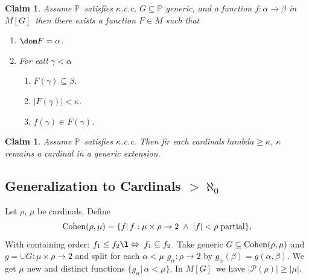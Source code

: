 \documentclass[11pt,pdftex,twoside,a4paper]{article}
\newcommand{\Cohen}{\mathop{\rm Cohen}\nolimits}
\newcommand{\dsP}{\ensuremath{\mathds{P}}}
\newcommand{\kcc}{\(\kappa\).c.c}
\newcommand{\MG}{\ensuremath{M[G]}}
\newcommand{\Power}{\ensuremath{\mathcal{P}}}
\newtheorem{claim}[thm]{Claim}
\theoremstyle{definition}
\begin{document}
\begin{claim}
Assume \dsP\ satisfies \kcc, \(G\subseteq\dsP\) generic, and a function
\(f:\alpha\to\beta\) in \MG\ then there exists a function \(F\in M\)
such that
\begin{enumerate}[label={(\alph*)}]
  \item \(\dom F = \alpha\).
  \item For eall \(\gamma<\alpha\)
    \begin{enumerate}[label={(\alph{enumi}\arabic*)}]
      \item \(F(\gamma)\subseteq \beta\).
      \item \(|F(\gamma)|<\kappa\).
      \item \(f(\gamma)\in F(\gamma)\).
    \end{enumerate}
\end{enumerate}
\end{claim}

\begin{claim}
Assume \dsP\ satisfies \kcc. Then fir each cardinals \(lambda\geq\kappa\), 
\(\kappa\) remains a cardinal in a generic extension.
\end{claim}

\subsection{Generalization to Cardinals \(>\aleph_0\)}

Let \(\rho\), \(\mu\) be cardinals. Define
\begin{equation*}
\Cohen(\rho, \mu) = \{f|\, f:\mu\times\rho\to 2\;\land\;|f|<\rho\;
  \textnormal{partial}\},
\end{equation*}
With containing order: \(f_1\leq f_2\l\Leftrightarrow\;f_1\subseteq f_2\).
Take generic \(G\subseteq\Cohen(\rho, \mu)\) and
\(g = \cup G:\mu\times\rho\to 2\) and split for each \(\alpha<\mu\)
\(g_\alpha:\rho\to 2\) by \(g_\alpha(\beta) = g(\alpha,\beta)\).
We get \(\mu\) new and distinct functions \(\{g_\alpha|\, \alpha<\mu\}\).
In \MG\ we have \(|\Power(\rho)| \geq |\mu|\).

\end{document}
